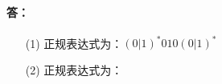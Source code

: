 \paragraph{答：}
\begin{enumerate}
	\item[(1)] 正规表达式为：$(0|1)^{*}010(0|1)^{*}$

	\item[(2)] 正规表达式为：$$
\end{enumerate}